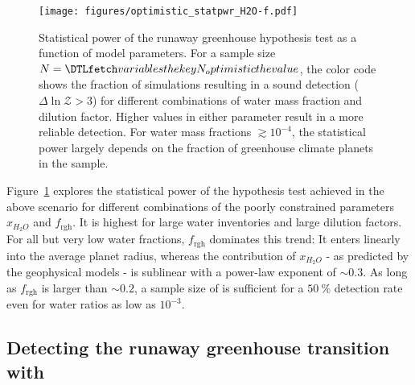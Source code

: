 \documentclass[twocolumn,twocolappendix]{aastex631}
\begin{document}
\begin{figure}[ht!]
    \begin{centering}
        \texttt{[image: figures/optimistic\_statpwr\_H2O-f.pdf]}
        \caption{
            Statistical power of the runaway greenhouse hypothesis test as a function of model parameters.
            For a sample size $N = \var{N_optimistic}$, the color code shows the fraction of simulations resulting in a sound detection ($\Delta \ln \mathcal{Z} > 3$) for different combinations of water mass fraction and dilution factor.
            Higher values in either parameter result in a more reliable detection.
            For water mass fractions $\gtrsim 10^{-4}$, the statistical power largely depends on the fraction of greenhouse climate planets in the sample.
        }
        \label{fig:statpwr_H2O-f}
    \end{centering}
\end{figure}
Figure~\ref{fig:statpwr_H2O-f} explores the statistical power of the hypothesis test achieved in the above scenario for different combinations of the poorly constrained parameters $x_{H_2O}$ and $f_\mathrm{rgh}$.
It is highest for large water inventories and large dilution factors.
 For all but very low water fractions, $f_\mathrm{rgh}$ dominates this trend: It enters linearly into the average planet radius, whereas the contribution of $x_{H_2O}$ - as predicted by the geophysical models - is sublinear with a power-law exponent of $\sim 0.3$.
As long as $f_\mathrm{rgh}$ is larger than $\sim 0.2$, a sample size of  is sufficient for a $\SI{50}{\percent}$ detection rate even for water ratios as low as $10^{-3}$.



\subsection{Detecting the runaway greenhouse transition with \plato}\label{sec:res_samplesize}
\end{document}
